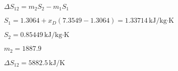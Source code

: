 \( \Delta S_{12} = m_2 S_2 - m_1 S_1 \)  

\( S_1 = 1.3064 + x_D (7.3549 - 1.3064) = 1.33714 \, \text{kJ/kg·K} \)  

\( S_2 = 0.85449 \, \text{kJ/kg·K} \)  

\( m_2 = 1887.9 \)  

\( \Delta S_{12} = 5882.5 \, \text{kJ/K} \)